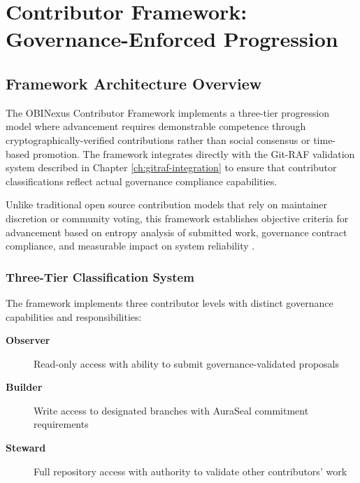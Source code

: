 \chapter{Contributor Framework: Governance-Enforced Progression}
\label{ch:contributor-framework}

\section{Framework Architecture Overview}

The OBINexus Contributor Framework implements a three-tier progression model where advancement requires demonstrable competence through cryptographically-verified contributions rather than social consensus or time-based promotion. The framework integrates directly with the Git-RAF validation system described in Chapter \ref{ch:gitraf-integration} to ensure that contributor classifications reflect actual governance compliance capabilities.

Unlike traditional open source contribution models that rely on maintainer discretion or community voting, this framework establishes objective criteria for advancement based on entropy analysis of submitted work, governance contract compliance, and measurable impact on system reliability \cite{TODO:contributor-progression-spec}.

\subsection{Three-Tier Classification System}

The framework implements three contributor levels with distinct governance capabilities and responsibilities:

\begin{description}
\item[\textbf{Observer}] Read-only access with ability to submit governance-validated proposals
\item[\textbf{Builder}] Write access to designated branches with AuraSeal commitment requirements
\item[\textbf{Steward}] Full repository access with authority to validate other contributors' work
\end{description}

